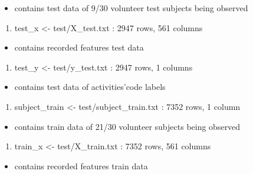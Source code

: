 \documentclass[
]{article}
\providecommand{\tightlist}{%
  \setlength{\itemsep}{0pt}\setlength{\parskip}{0pt}}
\begin{document}
\begin{itemize}
\tightlist
\item
  contains test data of 9/30 volunteer test subjects being observed
\end{itemize}

\begin{enumerate}
\def\labelenumi{\arabic{enumi}.}
\setcounter{enumi}{3}
\tightlist
\item
  test\_x \textless- test/X\_test.txt : 2947 rows, 561 columns
\end{enumerate}

\begin{itemize}
\tightlist
\item
  contains recorded features test data
\end{itemize}

\begin{enumerate}
\def\labelenumi{\arabic{enumi}.}
\setcounter{enumi}{4}
\tightlist
\item
  test\_y \textless- test/y\_test.txt : 2947 rows, 1 columns
\end{enumerate}

\begin{itemize}
\tightlist
\item
  contains test data of activities'code labels
\end{itemize}

\begin{enumerate}
\def\labelenumi{\arabic{enumi}.}
\setcounter{enumi}{5}
\tightlist
\item
  subject\_train \textless- test/subject\_train.txt : 7352 rows, 1
  column
\end{enumerate}

\begin{itemize}
\tightlist
\item
  contains train data of 21/30 volunteer subjects being observed
\end{itemize}

\begin{enumerate}
\def\labelenumi{\arabic{enumi}.}
\setcounter{enumi}{6}
\tightlist
\item
  train\_x \textless- test/X\_train.txt : 7352 rows, 561 columns
\end{enumerate}

\begin{itemize}
\tightlist
\item
  contains recorded features train data
\end{itemize}
\end{document}
